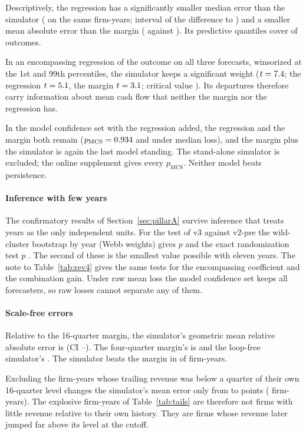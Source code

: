 Descriptively, the regression has a significantly smaller median error than the simulator (\PMlTwinMed{} on the same firm-years; interval of the difference \PMlTwinLo{} to \PMlTwinHi) and a smaller mean absolute error than the margin (\PMlMean{} against \PMlMeanNthree). Its predictive quantiles cover \PMlCov{} of outcomes.

In an encompassing regression of the outcome on all three forecasts, winsorized at the 1st and 99th percentiles, the simulator keeps a significant weight ($t=7.4$; the regression $t=5.1$, the margin $t=3.1$; critical value \PMlEncCrit). Its departures therefore carry information about mean cash flow that neither the margin nor the regression has.

In the model confidence set with the regression added, the regression and the margin both remain ($p_{\mathrm{MCS}}=0.934$ and \PMcsMlMedNthreeP{} under median loss), and the margin plus the simulator is again the last model standing. The stand-alone simulator is excluded; the online supplement gives every $p_{\mathrm{MCS}}$. Neither model beats persistence.

\paragraph{Inference with few years} The confirmatory results of Section~\ref{sec:pillarA} survive inference that treats years as the only independent units. For the test of v3 against v2-pre the wild-cluster bootstrap by year (Webb weights) gives $p$ \PWildSonePrel{} and the exact randomization test $p$ \PRandSonePrel. The second of these is the smallest value possible with eleven years. The note to Table~\ref{tab:rev4} gives the same tests for the encompassing coefficient and the combination gain. Under raw mean loss the model confidence set keeps all \PMcsRawSize{} forecasters, so raw losses cannot separate any of them.

\paragraph{Scale-free errors} Relative to the 16-quarter margin, the simulator's geometric mean relative absolute error is \PGmraeTwin{} (CI \PGmraeTwinLo--\PGmraeTwinHi). The four-quarter margin's is \PGmraeFour{} and the loop-free simulator's \PGmraeNoloops. The simulator beats the margin in \PGmraeTwinBeats{} of firm-years.

Excluding the \PNearZeroN{} firm-years whose trailing revenue was below a quarter of their own 16-quarter level changes the simulator's mean error only from \PCommonMeanTwin{} to \PNearZeroTwinMean{} points (\PCommonMeanN{} firm-years). The explosive firm-years of Table~\ref{tab:tails} are therefore not firms with little revenue relative to their own history. They are firms whose revenue later jumped far above its level at the cutoff.

